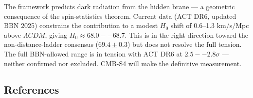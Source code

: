 \documentclass[aps,prd,preprint,superscriptaddress,longbibliography,floatfix]{revtex4-2}
\theoremstyle{remark}
\begin{document}
The framework predicts dark radiation from the hidden brane --- a geometric consequence of the spin-statistics theorem. Current data (ACT DR6, updated BBN 2025) constrains the contribution to a modest $H_{0}$ shift of 0.6--1.3 km/s/Mpc above $\Lambda CDM$, giving $H_{0} \approx 68.0--68.7$. This is in the right direction toward the non-distance-ladder consensus ($69.4 \pm 0.3$) but does not resolve the full tension. The full BBN-allowed range is in tension with ACT DR6 at $2.5--2.8\sigma$ --- neither confirmed nor excluded. CMB-S4 will make the definitive measurement.



\subsection{References}
\end{document}
